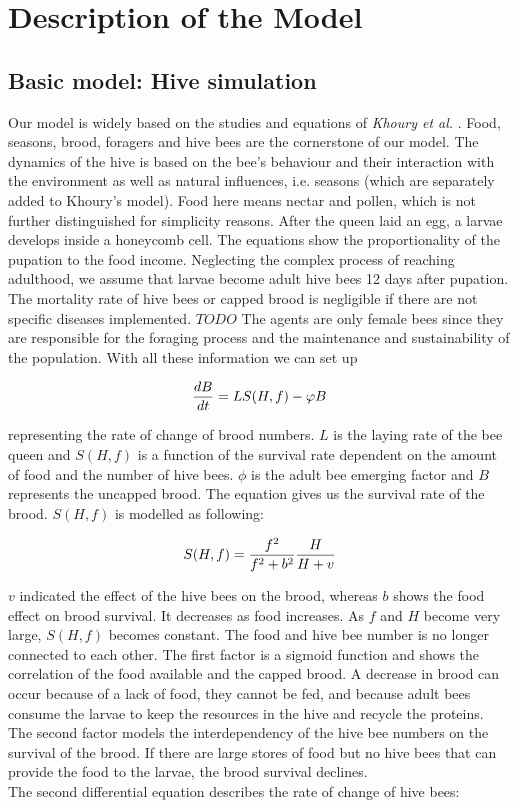 \section{Description of the Model}
\subsection{Basic model: Hive simulation}
	Our model is widely based on the studies and equations of \textit{Khoury et al.} \cite{khoury13}. Food, seasons, brood, foragers and hive bees are the cornerstone of our model. The dynamics of the hive is based on the bee's behaviour and their interaction with the environment as well as natural influences, i.e. seasons (which are separately added to Khoury's model). Food here means nectar and pollen, which is not further distinguished for simplicity reasons. After the queen laid an egg, a larvae develops inside a honeycomb cell. The equations show the proportionality of the pupation to the food income. Neglecting the complex process of reaching adulthood, we assume that larvae become adult hive bees 12 days after pupation. The mortality rate of hive bees or capped brood is negligible if there are not specific diseases implemented. $TODO$ The agents are only female bees since they are responsible for the foraging process and the maintenance and sustainability of the population. With all these information we can set up
	
	\begin{equation}\label{eq:changeBroodNumbers}
		{dB \over dt} = LS(H,f)-\phi B
	\end{equation}
	
	representing the rate of change of brood numbers. $L$ is the laying rate of the bee queen and $S(H,f)$ is a function of the survival rate dependent on the amount of food and  the number of hive bees. $\phi$ is the adult bee emerging factor and $B$ represents the uncapped brood. The equation gives us the survival rate of the brood. $S(H,f)$ is modelled as following:
	
	\begin{equation}\label{eq:functionHiveBeesFood}
		S(H,f)={f^2 \over f^2+b^2}{H \over H+v}
	\end{equation}
	
	$v$ indicated the effect of the hive bees on the brood, whereas $b$ shows the food effect on brood survival. It decreases as food increases. As $f$ and $H$ become very large, $S(H,f)$ becomes constant. The food and hive bee number is no longer connected to each other. The first factor is a sigmoid function and shows the correlation of the food available and the capped brood. A decrease in brood can occur because of a lack of food, they cannot be fed, and because adult bees consume the larvae to keep the resources in the hive and recycle the proteins. The second factor models the interdependency of the hive bee numbers on the survival of the brood. If there are large stores of food but no hive bees that can provide the food to the larvae, the brood survival declines.  
	\\
	The second differential equation describes the rate of change of hive bees:
	
